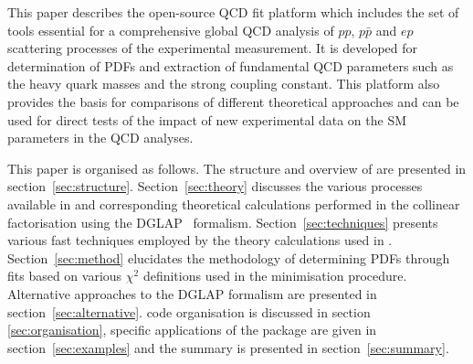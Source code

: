 This paper describes the open-source QCD fit platform \fitter which includes the set of tools  essential for a comprehensive global 
QCD analysis of $pp$, $p\bar{p}$ and $ep$ scattering processes of the experimental measurement. 
It is developed for determination of PDFs and extraction of fundamental QCD parameters such as the heavy
quark masses and the strong coupling constant. This platform also provides the basis for 
comparisons of different theoretical approaches and can be used for direct tests of the impact 
of new experimental data on the SM parameters in the QCD analyses.

This paper is organised as follows.
%
The structure and overview of \fitter are presented in section~\ref{sec:structure}.
Section~\ref{sec:theory} discusses the various processes available in \fitter
and corresponding theoretical calculations performed in the collinear factorisation using the DGLAP~\cite{Gribov:1972ri,Gribov:1972rt,Lipatov:1974qm,
Dokshitzer:1977sg,Altarelli:1977zs} formalism.
%
Section~\ref{sec:techniques} presents various fast techniques employed by the theory calculations used in \fitter.
Section~\ref{sec:method} elucidates the 
methodology of determining PDFs through fits based on various
 $\chi^2$ definitions used in the
minimisation procedure. 
Alternative approaches to the DGLAP formalism are presented in section~\ref{sec:alternative}.
%
\fitter code organisation is discussed in section \ref{sec:organisation}, specific applications 
of the package are given in section~\ref{sec:examples} and the summary is presented in section~\ref{sec:summary}.
%
